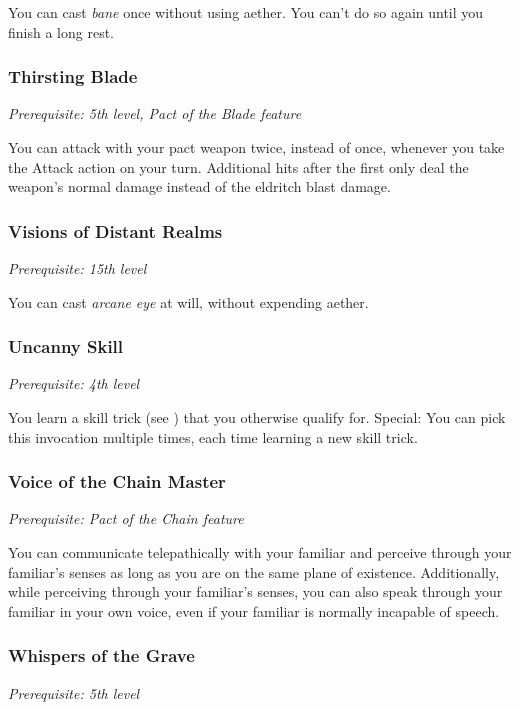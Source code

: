 You can cast \textit{bane} once without using aether. You can't do so again until you finish a long rest.

\subsubsection{Thirsting Blade}

\textit{Prerequisite: 5th level, Pact of the Blade feature}

You can attack with your pact weapon twice, instead of once, whenever you take the Attack action on your turn. Additional hits after the first only deal the weapon's normal damage instead of the eldritch blast damage.

\subsubsection{Visions of Distant Realms}

\textit{Prerequisite: 15th level}

You can cast \textit{arcane eye} at will, without expending aether.

\subsubsection{Uncanny Skill}
\textit{Prerequisite: 4th level}

You learn a skill trick (see ) that you otherwise qualify for. Special: You can pick this invocation multiple times, each time learning a new skill trick.

\subsubsection{Voice of the Chain Master}

\textit{Prerequisite: Pact of the Chain feature}

You can communicate telepathically with your familiar and perceive through your familiar's senses as long as you are on the same plane of existence. Additionally, while perceiving through your familiar's senses, you can also speak through your familiar in your own voice, even if your familiar is normally incapable of speech.

\subsubsection{Whispers of the Grave}

\textit{Prerequisite: 5th level}


